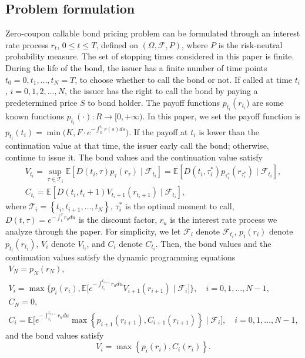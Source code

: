\documentclass[10pt,a4paper]{amsart}
\numberwithin{equation}{section}
\begin{document}
\subsection{Problem formulation}
\label{lower}
Zero-coupon callable bond pricing problem can be formulated through an interest rate 
process
$ r_{t}$, $0 \leq t \leq T $, defined on $\left( \Omega, \mathcal{F}, P \right)$, where 
$P$ is the risk-neutral probability measure. The set of stopping times considered in 
this paper is finite. During the life of the bond, the issuer has a finite number of 
time points $t_0=0,t_1,\dots,t_N=T$, to choose whether to call the bond or not.
If called at time $t_{i}$, $i=0,1,2, \dots, N$, the issuer has the right to call the
 bond by paying a predetermined price $S$ to bond holder.
The payoff functions
$p_{t_i}\left(r_{t_{i}}\right.$) are some known functions 
$p_{t_i}(\cdot):R \to [0,+\infty)$.
In this paper, we set the payoff function is
$p_{t_i}(t_i)=\min \big(K, F \cdot e^{-\int_0^{t_i} r(s) d s}\big)$.
If the payoff at $t_i$ is lower than the continuation value at that time, the 
issuer early call the bond; otherwise, continue to issue it. The bond values and the
continuation value satisfy
\begin{gather*}
V_{t_i}=\sup _{\tau \in \mathcal{T}_{i}} \mathbb{E}\left[D\left(t_i, \tau\right) 
p_{\tau}\left(r_{\tau}\right) \mid \mathcal{F}_{t_i} \right]
=\mathbb{E}\left[D\left(t_i, \tau^{\ast }_i \right) p_{\tau^{\ast }_i }
\left(r_{\tau^{\ast }_i }\right) \mid \mathcal{F}_{t_i} \right],
\\
 C_{t_i}=\mathbb{E}\left[D\left(t_i, t_i+1\right) V_{t_i+1}
 \left(r_{t_i+1}\right) \mid \mathcal{F}_{t_i}\right],
\end{gather*}
where $\mathcal{T}_{i}=\left\{t_{i}, t_{i+1}, \dots, t_{N}\right\}$,
$\tau^{\ast }_i$ is the optimal moment to call, 
$D\left(t, \tau\right)=e^{-\int_{t}^{\tau} r_{u} d u}$ is the discount factor,
$r_{u}$ is the interest rate process we analyze through the paper.
For simplicity, we let $\mathcal{F}_i$ denote $\mathcal{F}_{t_i}$, 
$p_{i}\left(r_{i}\right)$ denote $p_{t_{i}}\left(r_{t_{i}}\right)$, $V_{i}$ denote $V_{t_i}$, and $C_{i}$ denote $C_{t_i}$. Then, the bond values and the continuation values satisfy the dynamic programming equations
\begin{equation}
\label{dynamic}
\begin{gathered}
V_{N}=p_{N}\left(r_N\right), \\
V_{i}=\max \Big\{p_{i}\left(r_i\right), \mathbb{E}\Big[
e^{-\int_{t_i}^{t_{i+1}} r_{u} d u} V_{i+1}\left(r_{i+1}\right) 
\mid \mathcal{F}_i\Big]\Big\}, \quad i=0,1, \dots, N-1 ,\\
C_{N}=0, \\
C_{i}=\mathbb{E}\Big[
e^{-\int_{t_i}^{t_{i+1}} r_{u} d u}
\max \left\{p_{i+1}\left(r_{i+1}\right), C_{i+1}
\left(r_{i+1}\right)\right\} \mid \mathcal{F}_i\Big], \quad i=0,1, \dots, N-1 ,
\end{gathered}
\end{equation}
and the bond values satisfy
\[
V_{i}=\max \left\{p_{i}\left(r_i\right), C_{i}\left(r_i\right)\right\} .
\]
\end{document}
